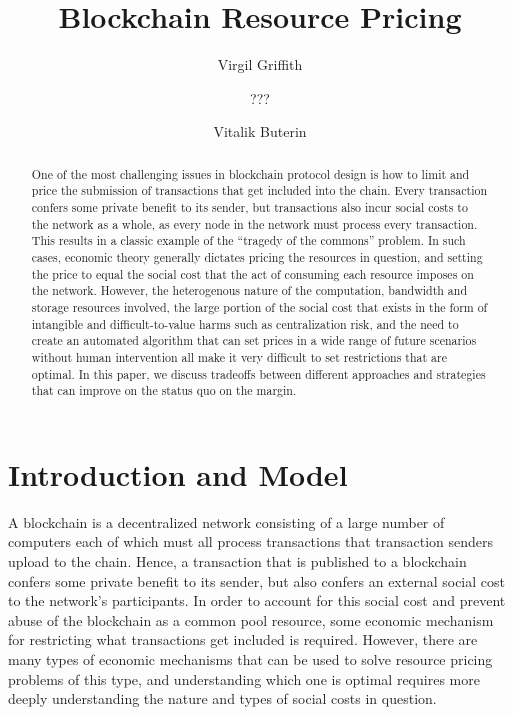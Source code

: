 \documentclass[12pt, final]{article}
\author{Virgil Griffith}
\author{???}
\author{Vitalik Buterin}
\title{Blockchain Resource Pricing}
\begin{document}
\maketitle
\vspace{-0.2in} \TODO{\today}





\begin{abstract}

One of the most challenging issues in blockchain protocol design is how to limit and price the submission of transactions that get included into the chain. Every transaction confers some private benefit to its sender, but transactions also incur social costs to the network as a whole, as every node in the network must process every transaction. This results in a classic example of the ``tragedy of the commons'' problem. In such cases, economic theory generally dictates pricing the resources in question, and setting the price to equal the social cost that the act of consuming each resource imposes on the network. However, the heterogenous nature of the computation, bandwidth and storage resources involved, the large portion of the social cost that exists in the form of intangible and difficult-to-value harms such as centralization risk, and the need to create an automated algorithm that can set prices in a wide range of future scenarios without human intervention all make it very difficult to set restrictions that are optimal. In this paper, we discuss tradeoffs between different approaches and strategies that can improve on the status quo on the margin.
\end{abstract}

\section{Introduction and Model}

A blockchain is a decentralized network consisting of a large number of computers each of which must all process transactions that transaction senders upload to the chain. Hence, a transaction that is published to a blockchain confers some private benefit to its sender, but also confers an external social cost to the network's participants. In order to account for this social cost and prevent abuse of the blockchain as a common pool resource, some economic mechanism for restricting what transactions get included is required. However, there are many types of economic mechanisms that can be used to solve resource pricing problems of this type, and understanding which one is optimal requires more deeply understanding the nature and types of social costs in question.
\end{document}
